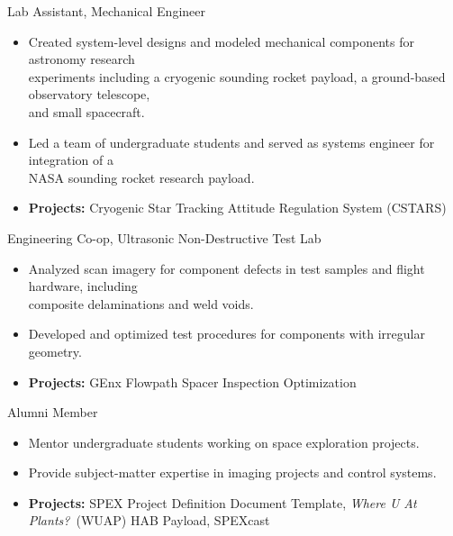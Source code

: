 \documentclass[10pt,final,sans]{resume}
\begin{document}
Lab Assistant, Mechanical Engineer
\begin{itemize}
  \item Created system-level designs and modeled mechanical components for
  astronomy research \\ 
  experiments including a cryogenic sounding rocket payload, a ground-based
  observatory telescope, \\
  and small spacecraft.
  \item Led a team of undergraduate students and served as systems engineer for
  integration of a \\
  NASA sounding rocket research payload.
  \item {\bf Projects:} Cryogenic Star Tracking Attitude Regulation System
  (CSTARS)
\end{itemize}

Engineering Co-op, Ultrasonic Non-Destructive Test Lab
\begin{itemize}
  \item Analyzed scan imagery for component defects in test samples and flight
  hardware, including \\
  composite delaminations and weld voids.
  \item Developed and optimized test procedures for components with irregular
  geometry.
  \item {\bf Projects:} GEnx Flowpath Spacer Inspection Optimization
\end{itemize}

Alumni Member
\begin{itemize}
  \item Mentor undergraduate students working on space exploration projects.
  \item Provide subject-matter expertise in imaging projects and control systems.
  \item {\bf Projects:} SPEX Project Definition Document Template, {\it Where U
  At Plants?}~(WUAP) HAB Payload, SPEXcast
\end{itemize}

\end{document}
